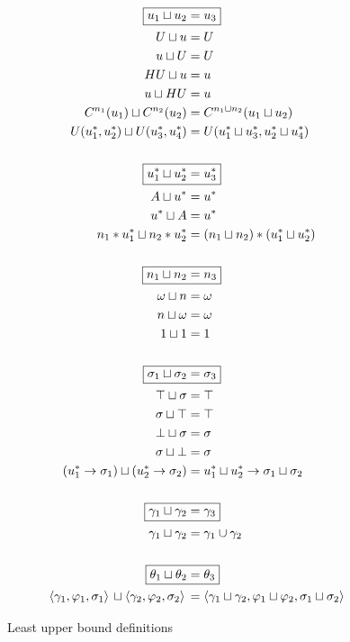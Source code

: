 \begin{figure}
\begin{alignat*}{1}
  \Aboxed{u_1 \llub u_2 &= u_3} \\
  U \llub u  &= U \\
  u \llub U  &= U \\
  HU \llub u &= u \\
  u \llub HU &= u \\
  C^{n_1}(u_1) \llub C^{n_2}(u_2) &= C^{n_1 \llub n_2}(u_1 \llub u_2) \\
  U(u^*_1, u^*_2) \llub U(u^*_3, u^*_4) &= U(u^*_1 \llub u^*_3, u^*_2 \llub u^*_4) \\
  &\\
  \Aboxed{u^*_1 \llub u^*_2 &= u^*_3} \\
  A \llub u^* &= u^* \\
  u^* \llub A &= u^* \\ 
  n_1*u^*_1 \llub n_2*u^*_2 &= (n_1 \llub n_2) * (u^*_1 \llub u^*_2) \\
  &\\
  \Aboxed{n_1 \llub n_2 &= n_3} \\
  \omega \llub n &= \omega \\
  n \llub \omega &= \omega \\
  1 \llub 1 &= 1 \\
  &\\
  \Aboxed{\sigma_1 \llub \sigma_2 &= \sigma_3} \\
  \top \llub \sigma &= \top \\
  \sigma \llub \top &= \top \\
  \bot \llub \sigma &= \sigma \\
  \sigma \llub \bot &= \sigma \\
  (u^*_1 \to \sigma_1) \llub (u^*_2 \to \sigma_2) &= u^*_1 \llub u^*_2 \to \sigma_1 \llub \sigma_2 \\
  &\\
  \Aboxed{\gamma_1 \llub \gamma_2 &= \gamma_3} \\
  \gamma_1 \llub \gamma_2 &= \gamma_1 \cup \gamma_2 \\
  &\\
  \Aboxed{\theta_1 \llub \theta_2 &= \theta_3} \\
  \lTriple{\gamma_1}{\varphi_1}{\sigma_1} \llub \lTriple{\gamma_2}{\varphi_2}{\sigma_2} &= \lTriple{\gamma_1 \llub \gamma_2}{\varphi_1 \llub \varphi_2}{\sigma_1 \llub \sigma_2} \\
\end{alignat*}
\caption{Least upper bound definitions}
\label{fig:lub}
\end{figure}

